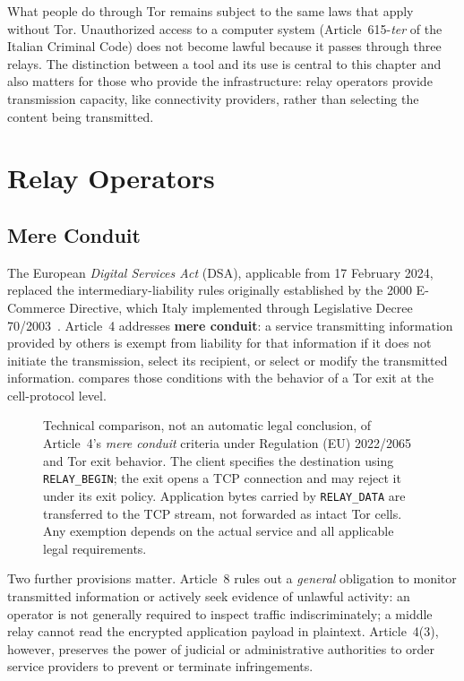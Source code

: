 What people do through Tor remains subject to the same laws that apply without Tor. Unauthorized access to a computer system (Article~615-\emph{ter} of the Italian Criminal Code) does not become lawful because it passes through three relays. The distinction between a tool and its use is central to this chapter and also matters for those who provide the infrastructure: relay operators provide transmission capacity, like connectivity providers, rather than selecting the content being transmitted.

\section{Relay Operators}\label{sec:legale-relay}

\subsection{Mere Conduit}

The European \emph{Digital Services Act} (DSA), applicable from 17 February 2024, replaced the intermediary-liability rules originally established by the 2000 E-Commerce Directive, which Italy implemented through Legislative Decree 70/2003~\cite{dsa2022}. Article~4 addresses \textbf{mere conduit}: a service transmitting information provided by others is exempt from liability for that information if it does not initiate the transmission, select its recipient, or select or modify the transmitted information.  compares those conditions with the behavior of a Tor exit at the cell-protocol level.

\begin{figure}[htbp]
\centering

\caption{Technical comparison, not an automatic legal conclusion, of Article~4's \emph{mere conduit} criteria under Regulation (EU) 2022/2065 and Tor exit behavior. The client specifies the destination using \texttt{RELAY\_BEGIN}; the exit opens a TCP connection and may reject it under its exit policy. Application bytes carried by \texttt{RELAY\_DATA} are transferred to the TCP stream, not forwarded as intact Tor cells. Any exemption depends on the actual service and all applicable legal requirements.}
\label{fig:conduit}
\end{figure}

Two further provisions matter. Article~8 rules out a \emph{general} obligation to monitor transmitted information or actively seek evidence of unlawful activity: an operator is not generally required to inspect traffic indiscriminately; a middle relay cannot read the encrypted application payload in plaintext. Article~4(3), however, preserves the power of judicial or administrative authorities to order service providers to prevent or terminate infringements.


